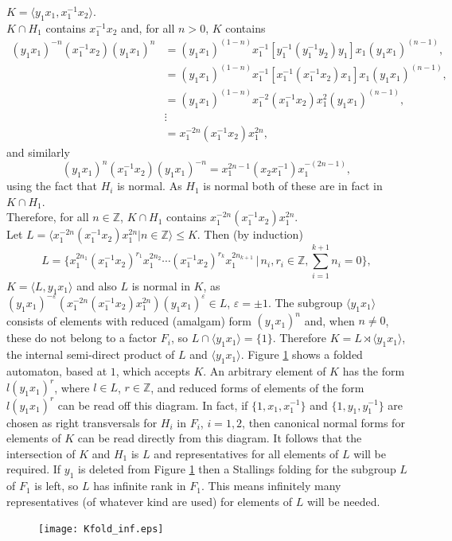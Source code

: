 \documentclass[a4paper,12pt]{article}
\newcommand{\e}{\varepsilon }
\numberwithin{equation}{section}
\numberwithin{figure}{section}
\newcommand{\ZZ}{\ensuremath{\mathbb{Z}}}
\newcommand{\la}{\langle}
\newcommand{\ra}{\rangle}
\begin{document}
\par\noindent $K=\la y_1x_1,x_1^{-1}x_2\ra$. \\[1em]
$K\cap H_1$ contains $x_1^{-1}x_2$ and, for all $n>0$, $K$ contains
\begin{align*}
(y_1x_1)^{-n}(x_1^{-1}x_2)(y_1x_1)^{n}&=(y_1x_1)^{(1-n)}x_1^{-1}[y_1^{-1}(y_1^{-1}y_2)y_1]x_1(y_1x_1)^{(n-1)},\\
&=(y_1x_1)^{(1-n)}x_1^{-1}[x_1^{-1}(x_1^{-1}x_2)x_1]x_1(y_1x_1)^{(n-1)},\\
&=(y_1x_1)^{(1-n)}x_1^{-2}(x_1^{-1}x_2)x_1^2(y_1x_1)^{(n-1)},\\
&\vdots\\
&=x_1^{-2n}(x_1^{-1}x_2) x_1^{2n},
\end{align*}
and similarly
\[(y_1x_1)^{n}(x_1^{-1}x_2)(y_1x_1)^{-n}=x_1^{2n-1}(x_2x_1^{-1}) x_1^{-(2n-1)},\]
 using the fact that $H_i$ is normal. 
As $H_1$ is normal both of these are in fact in $K\cap H_1$. \\[1em]
Therefore, for all $n\in \ZZ$, $K\cap H_1$ contains $x_1^{-2n}(x_1^{-1}x_2) x_1^{2n}$. \\[1em]
Let $L=\la x_1^{-2n}(x_1^{-1}x_2) x_1^{2n}|n\in \ZZ\ra\le K$. Then (by induction)  
\[L=\{x_1^{2n_1}(x_1^{-1}x_2)^{r_1}x_1^{2n_2}\cdots (x_1^{-1}x_2)^{r_k}x_1^{2n_{k+1}}\,|\,n_i,r_i\in\ZZ,\textstyle{\sum_{i=1}^{k+1}} n_i=0\},\]
$K=\la L, y_1x_1\ra$ 
and also $L$ is normal in $K$, as $(y_1x_1)^{-\e}(x_1^{-2n}(x_1^{-1}x_2) x_1^{2n})(y_1x_1)^{\e}\in L$, $\e=\pm 1$.  
The subgroup $\la y_1x_1\ra$ consists of elements with reduced (amalgam) form $(y_1x_1)^n$ and, when $n\neq 0$, 
these do not belong to a factor $F_i$, so $L\cap \la y_1x_1\ra=\{1\}$. 
Therefore
$K=L\rtimes \la y_1x_1\ra$, the internal semi-direct product of $L$ and $\la y_1x_1\ra$. 
Figure \ref{fig:Kfold_inf} shows a folded automaton, based at $1$, which accepts  $K$.
 An arbitrary element of $K$ has the form $l(y_1x_1)^r$, where $l\in L$, $r\in\ZZ$, and reduced forms of 
 elements of the form $l(y_1x_1)^r$ can be read off this diagram.  In fact, if $\{1,x_1,x_1^{-1}\}$ and
$\{1,y_1,y_1^{-1}\}$ are chosen as right transversals for $H_i$ in $F_i$, $i=1,2$, then canonical normal forms
for elements of $K$ can be read directly from this diagram.
It follows that 
 the intersection of $K$ and $H_1$ is $L$ and  representatives for all 
elements of $L$ will be  required. 
 If $y_1$ is deleted from Figure \ref{fig:Kfold_inf} 
 then a  Stallings folding for the subgroup $L$ of $F_1$ is left, so $L$ has infinite
rank in $F_1$. This means infinitely many representatives (of whatever kind are used) 
 for elements of $L$ will 
be needed. 
\begin{figure}
\begin{center}
\texttt{[image: Kfold\_inf.eps]}
\caption{}\label{fig:Kfold_inf}
\end{center}
\end{figure}
%
%
\end{document}

